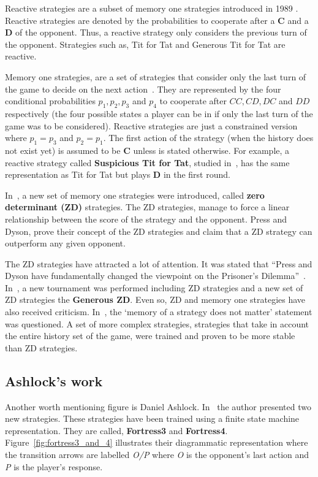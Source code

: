 \documentclass{article}
\begin{document}
Reactive strategies are a subset of memory one strategies introduced in 1989
\cite{nowak1989}. Reactive strategies are denoted by the probabilities to cooperate
after a \textbf{C} and a \textbf{D} of the opponent. Thus, a reactive strategy
only considers the previous turn of the opponent. Strategies such as, Tit for
Tat and Generous Tit for Tat are reactive.

Memory one strategies, are a set of strategies that consider only the last turn
of the game to decide on the next action~\cite{Nowak1990}. They are represented
by the four conditional probabilities \(p_1, p_2, p_3\) and
\(p_4\) to cooperate after \(CC, CD, DC\) and \(DD\) respectively
(the four possible states a player can be in if only the last turn of the game was
to be considered). Reactive strategies are just a constrained version where
\(p_1=p_3\) and \(p_2=p_1\). The first action of the strategy (when the history
does not exist yet) is assumed to be \textbf{C} unless is stated otherwise. For
example, a reactive strategy called \textbf{Suspicious Tit for Tat}, studied
in~\cite{Nowak1992}, has the same representation as Tit for Tat but plays
\textbf{D} in the first round.

In~\cite{Press2012}, a new set of memory one strategies were introduced, called
\textbf{zero determinant (ZD)} strategies. The ZD strategies,
manage to force a linear relationship between the score of the strategy
and the opponent. Press and Dyson, prove their concept of the ZD strategies
and claim that a ZD strategy can outperform any given opponent.

The ZD strategies have attracted a lot of attention. It was stated that
``Press and Dyson have fundamentally changed the viewpoint on the Prisoner's
Dilemma''~\cite{Stewart2012}. In~\cite{Stewart2012}, a new tournament was
performed including ZD strategies and a new set of ZD 
strategies the \textbf{Generous ZD}. Even so, ZD and memory one strategies have
also received criticism. In~\cite{Lee2015}, the `memory of a strategy does
not matter' statement was questioned. A set of more complex strategies,
strategies that take in account the entire history set of the game, were
trained and proven to be more stable than ZD strategies.

\subsection{Ashlock's work}

Another worth mentioning figure is Daniel Ashlock. In~\cite{Ashlock2006b} 
the author presented two new strategies. These strategies have
been trained using a finite state machine representation. They are called,
\textbf{Fortress3} and \textbf{Fortress4}. Figure~\ref{fig:fortress3_and_4}
illustrates their diagrammatic representation where the transition arrows are 
labelled \textit{O/P} where \textit{O} is the opponent's last action and \textit{P}
is the player's response.
\end{document}
